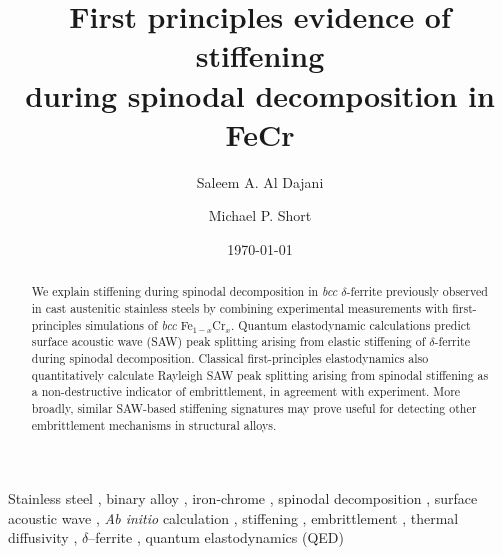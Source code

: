 \documentclass[final,3p,times]{elsarticle}
\begin{document}
\begin{frontmatter}

\title
{
\textbf
{
First principles evidence of stiffening \\ during spinodal decomposition in FeCr
}
}

\date
{\today}
\rhead{\today}

\author[1]{Saleem A. Al Dajani}
\author[1]{Michael P. Short}

\address{
Department of Nuclear Science and Engineering \\
Massachusetts Institute of Technology\\
77 Massachusetts Avenue \\
Cambridge, MA 02139}

\address[1]
{
Corresponding Author: \href{mailto:sdajani@mit.edu}{\texttt{sdajani@mit.edu}}
}

\begin{abstract}

We explain stiffening during spinodal decomposition in \emph{bcc} $\delta$-ferrite previously observed in cast austenitic stainless steels by combining experimental measurements with first-principles simulations of \emph{bcc} Fe$_{1-x}$Cr$_x$. Quantum elastodynamic calculations predict surface acoustic wave (SAW) peak splitting arising from elastic stiffening of $\delta$-ferrite during spinodal decomposition. Classical first-principles elastodynamics also quantitatively calculate Rayleigh SAW peak splitting arising from spinodal stiffening as a non-destructive indicator of embrittlement, in agreement with experiment. More broadly, similar SAW-based stiffening signatures may prove useful for detecting other embrittlement mechanisms in structural alloys.

\end{abstract}

\begin{keyword}
Stainless steel \sep 
binary alloy \sep
iron-chrome \sep
spinodal decomposition
\sep
surface acoustic wave \sep 
\emph{Ab initio} calculation
\sep
stiffening
\sep
embrittlement
\sep
thermal diffusivity
\sep
$\delta$--ferrite
\sep
quantum elastodynamics (QED)


\end{keyword}

\end{frontmatter}
\end{document}
